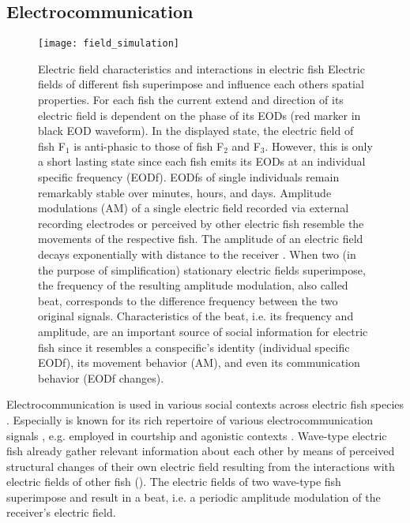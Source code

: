 \subsection{Electrocommunication}

\begin{figure}[h!]
	\centerline{\texttt{[image: field\_simulation]}}
	\caption{\label{field_simulation} Electric field characteristics and interactions in electric fish  Electric fields of different fish superimpose and influence each others spatial properties. For each fish the current extend and direction of its electric field is dependent on the phase of its EODs (red marker in black EOD waveform). In the displayed state, the electric field of fish F$_1$ is anti-phasic to those of fish F$_2$ and F$_3$. However, this is only a short lasting state since each fish emits its EODs at an individual specific frequency (EODf).  EODfs of single individuals remain remarkably stable over minutes, hours, and days.  Amplitude modulations (AM) of a single electric field recorded via external recording electrodes or perceived by other electric fish resemble the movements of the respective fish. The amplitude of an electric field decays exponentially with distance to the receiver \citep{Benda2020}.  When two (in the purpose of simplification) stationary electric fields superimpose, the frequency of the resulting amplitude modulation, also called beat, corresponds to the difference frequency between the two original signals. Characteristics of the beat, i.e. its frequency and amplitude, are an important source of social information for electric fish since it resembles a conspecific's identity (individual specific EODf), its movement behavior (AM), and even its communication behavior (EODf changes).}
\end{figure}

Electrocommunication is used in various social contexts across electric fish species \citep{Westby1970, Hupe2008, Silva2012, Smith2013}. Especially \lepto{} is known for its rich repertoire of various electrocommunication signals \citep{Smith2013}, e.g. employed in courtship \citep{Hagedorn1985, Henninger2018} and agonistic contexts \citep{Hupe2008, Triefenbach2008}. Wave-type electric fish already gather relevant information about each other by means of perceived structural changes of their own electric field resulting from the interactions with electric fields of other fish (). The electric fields of two wave-type fish superimpose and result in a beat, i.e. a periodic amplitude modulation of the receiver's electric field. 

